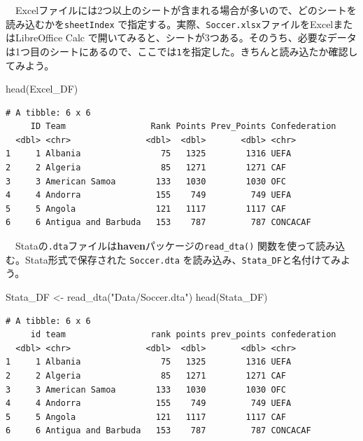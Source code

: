 \documentclass[
  a4paper,
  pandoc,
  ja=standard,
  jafont=haranoaji]{bxjsbook}
\newenvironment{Shaded}{\begin{snugshade}}{\end{snugshade}}
\newcommand{\FunctionTok}[1]{\textcolor[rgb]{0.28,0.35,0.67}{#1}}
\newcommand{\NormalTok}[1]{\textcolor[rgb]{0.00,0.48,0.65}{#1}}
\newcommand{\OtherTok}[1]{\textcolor[rgb]{0.00,0.48,0.65}{#1}}
\newcommand{\StringTok}[1]{\textcolor[rgb]{0.13,0.47,0.30}{#1}}
\begin{document}
　Excelファイルには2つ以上のシートが含まれる場合が多いので、どのシートを読み込むかを\texttt{sheetIndex}
で指定する。実際、\texttt{Soccer.xlsx}ファイルをExcelまたはLibreOffice
Calc
で開いてみると、シートが3つある。そのうち、必要なデータは1つ目のシートにあるので、ここでは\texttt{1}を指定した。きちんと読み込たか確認してみよう。

\begin{Shaded}
\begin{Highlighting}[numbers=left,,]
\FunctionTok{head}\NormalTok{(Excel\_DF)}
\end{Highlighting}
\end{Shaded}

\begin{verbatim}
# A tibble: 6 x 6
     ID Team                 Rank Points Prev_Points Confederation
  <dbl> <chr>               <dbl>  <dbl>       <dbl> <chr>        
1     1 Albania                75   1325        1316 UEFA         
2     2 Algeria                85   1271        1271 CAF          
3     3 American Samoa        133   1030        1030 OFC          
4     4 Andorra               155    749         749 UEFA         
5     5 Angola                121   1117        1117 CAF          
6     6 Antigua and Barbuda   153    787         787 CONCACAF     
\end{verbatim}

　Stataの\texttt{.dta}ファイルは\textbf{haven}パッケージの\texttt{read\_dta()}
関数を使って読み込む。Stata形式で保存された \texttt{Soccer.dta}
を読み込み、\texttt{Stata\_DF}と名付けてみよう。

\begin{Shaded}
\begin{Highlighting}[numbers=left,,]
\NormalTok{Stata\_DF }\OtherTok{\textless{}{-}} \FunctionTok{read\_dta}\NormalTok{(}\StringTok{"Data/Soccer.dta"}\NormalTok{)}
\FunctionTok{head}\NormalTok{(Stata\_DF)}
\end{Highlighting}
\end{Shaded}

\begin{verbatim}
# A tibble: 6 x 6
     id team                 rank points prev_points confederation
  <dbl> <chr>               <dbl>  <dbl>       <dbl> <chr>        
1     1 Albania                75   1325        1316 UEFA         
2     2 Algeria                85   1271        1271 CAF          
3     3 American Samoa        133   1030        1030 OFC          
4     4 Andorra               155    749         749 UEFA         
5     5 Angola                121   1117        1117 CAF          
6     6 Antigua and Barbuda   153    787         787 CONCACAF     
\end{verbatim}
\end{document}
